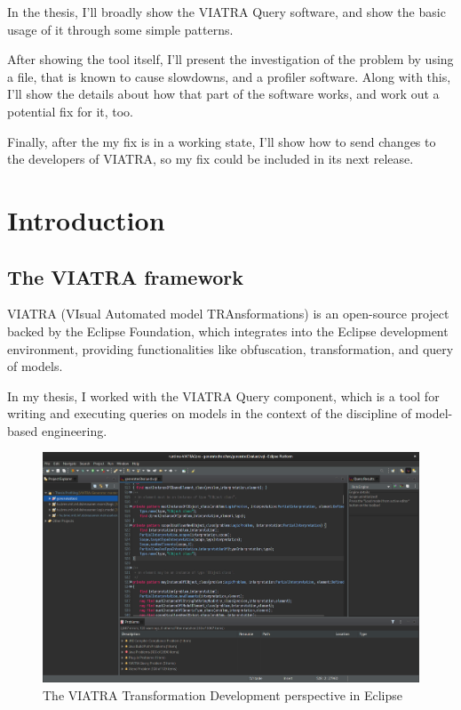 \documentclass[11pt,a4paper,oneside]{report}
\begin{document}
In the thesis, I'll broadly show the VIATRA Query software, and show the
basic usage of it through some simple patterns.

After showing the tool itself, I'll present the investigation of the problem by
using a file, that is known to cause slowdowns, and a profiler software. Along
with this, I'll show the details about how that part of the software works, and
work out a potential fix for it, too.

Finally, after the my fix is in a working state, I'll show how to send changes
to the developers of VIATRA, so my fix could be included in its next release.
\vfill


\cleardoublepage
\selectthesislanguage
{}
\setcounter{romanPage}{\value{page}}


\chapter{Introduction}

\section{The VIATRA framework}
VIATRA (VIsual Automated model TRAnsformations) is an open-source project backed
by the Eclipse Foundation, which integrates into the Eclipse development
environment, providing functionalities like obfuscation, transformation, and
query of models.

In my thesis, I worked with the VIATRA Query component, which is a tool for
writing and executing queries on models in the context of the discipline of
model-based engineering.

\begin{figure}[ht]
\centering
\includegraphics[width=150mm, keepaspectratio]{figures/eclipse-viatra.png}
\caption{The VIATRA Transformation Development perspective in Eclipse}
\label{fig:eclipse-viatra}
\end{figure}
\end{document}
